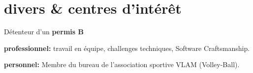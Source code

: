 \documentclass{friggeri-cv} 	%
\begin{document}

\section{divers \& centres d’intérêt}

Détenteur d’un \textbf{permis B}

\textbf{professionnel:} travail en équipe, challenges techniques, Software Craftsmanship.

\textbf{personnel:} Membre du bureau de l’association sportive VLAM (Volley-Ball).
\end{document}
